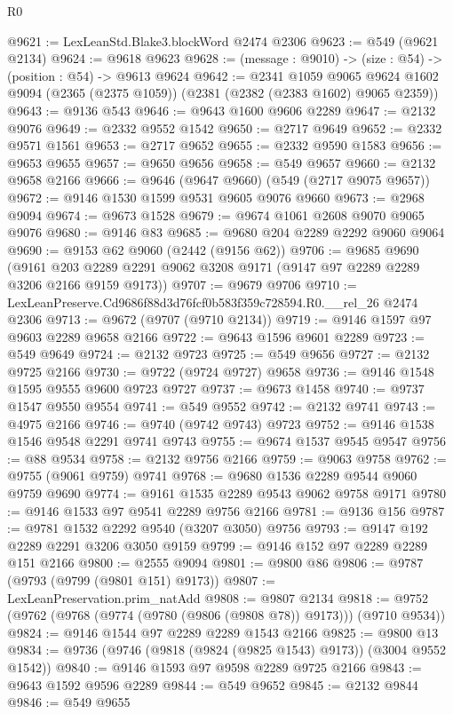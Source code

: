 \begin{lexlean}{R0}
\begin{coremodule}
@9621 := LexLeanStd.Blake3.blockWord @2474 @2306
@9623 := @549 (@9621 @2134)
@9624 := @9618 @9623
@9628 := (message : @9010) -> (size : @54) -> (position : @54) -> @9613 @9624
@9642 := @2341
    @1059
    @9065
    @9624
    @1602
    @9094
    (@2365 (@2375 @1059))
    (@2381 (@2382 (@2383 @1602) @9065 @2359))
@9643 := @9136 @543
@9646 := @9643 @1600 @9606 @2289
@9647 := @2132 @9076
@9649 := @2332 @9552 @1542
@9650 := @2717 @9649
@9652 := @2332 @9571 @1561
@9653 := @2717 @9652
@9655 := @2332 @9590 @1583
@9656 := @9653 @9655
@9657 := @9650 @9656
@9658 := @549 @9657
@9660 := @2132 @9658 @2166
@9666 := @9646 (@9647 @9660) (@549 (@2717 @9075 @9657))
@9672 := @9146 @1530 @1599 @9531 @9605 @9076 @9660
@9673 := @2968 @9094
@9674 := @9673 @1528
@9679 := @9674 @1061 @2608 @9070 @9065 @9076
@9680 := @9146 @83
@9685 := @9680 @204 @2289 @2292 @9060 @9064
@9690 := @9153 @62 @9060 (@2442 (@9156 @62))
@9706 := @9685
    @9690
    (@9161 @203 @2289 @2291 @9062 @3208 @9171 (@9147 @97 @2289 @2289 @3206 @2166 @9159 @9173))
@9707 := @9679 @9706
@9710 := LexLeanPreserve.Cd9686f88d3d76fcf0b583f359c728594.R0.__rel_26 @2474 @2306
@9713 := @9672 (@9707 (@9710 @2134))
@9719 := @9146 @1597 @97 @9603 @2289 @9658 @2166
@9722 := @9643 @1596 @9601 @2289
@9723 := @549 @9649
@9724 := @2132 @9723
@9725 := @549 @9656
@9727 := @2132 @9725 @2166
@9730 := @9722 (@9724 @9727) @9658
@9736 := @9146 @1548 @1595 @9555 @9600 @9723 @9727
@9737 := @9673 @1458
@9740 := @9737 @1547 @9550 @9554
@9741 := @549 @9552
@9742 := @2132 @9741
@9743 := @4975 @2166
@9746 := @9740 (@9742 @9743) @9723
@9752 := @9146 @1538 @1546 @9548 @2291 @9741 @9743
@9755 := @9674 @1537 @9545 @9547
@9756 := @88 @9534
@9758 := @2132 @9756 @2166
@9759 := @9063 @9758
@9762 := @9755 (@9061 @9759) @9741
@9768 := @9680 @1536 @2289 @9544 @9060 @9759 @9690
@9774 := @9161 @1535 @2289 @9543 @9062 @9758 @9171
@9780 := @9146 @1533 @97 @9541 @2289 @9756 @2166
@9781 := @9136 @156
@9787 := @9781 @1532 @2292 @9540 (@3207 @3050) @9756
@9793 := @9147 @192 @2289 @2291 @3206 @3050 @9159
@9799 := @9146 @152 @97 @2289 @2289 @151 @2166
@9800 := @2555 @9094
@9801 := @9800 @86
@9806 := @9787 (@9793 (@9799 (@9801 @151) @9173))
@9807 := LexLeanPreservation.prim_natAdd
@9808 := @9807 @2134
@9818 := @9752 (@9762 (@9768 (@9774 (@9780 (@9806 (@9808 @78)) @9173))) (@9710 @9534))
@9824 := @9146 @1544 @97 @2289 @2289 @1543 @2166
@9825 := @9800 @13
@9834 := @9736 (@9746 (@9818 (@9824 (@9825 @1543) @9173)) (@3004 @9552 @1542))
@9840 := @9146 @1593 @97 @9598 @2289 @9725 @2166
@9843 := @9643 @1592 @9596 @2289
@9844 := @549 @9652
@9845 := @2132 @9844
@9846 := @549 @9655

\end{coremodule}
\end{lexlean}
